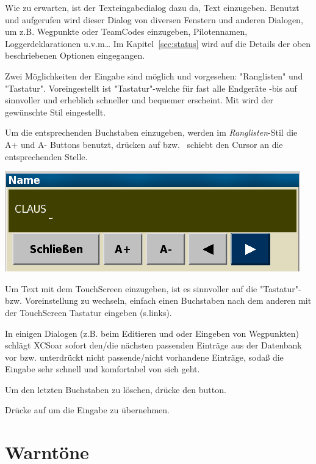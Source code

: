 Wie zu erwarten, ist der Texteingabedialog dazu da, Text einzugeben.
Benutzt und aufgerufen wird dieser Dialog von diversen Fenstern und anderen Dialogen, um z.B. Wegpunkte oder TeamCodes  einzugeben, Pilotennamen, Loggerdeklarationen u.v.m\dots
Im Kapitel~\ref{sec:status} wird auf die Details der oben beschriebenen Optionen eingegangen.

 Zwei Möglichkeiten der Eingabe sind möglich und vorgesehen:  "Ranglisten"  und "Tastatur".
Voreingestellt ist "Tastatur"-welche für fast alle Endgeräte -bis auf \al sinnvoller und erheblich schneller und bequemer erscheint. Mit  wird der gewünschte Stil eingestellt.

Um die entsprechenden  Buchstaben einzugeben, werden im \textit{Ranglisten}-Stil die A+ und  A- Buttons benutzt, drücken auf  \button{$<$} bzw.\   \button{$>$} schiebt den Cursor an die entsprechenden Stelle.
 
\begin{center}
\includegraphics[angle=0,width=0.65\linewidth,keepaspectratio='true']{figures/textentry.png}
\end{center}

Um Text mit dem TouchScreen einzugeben, ist es sinnvoller  auf die "Tastatur"- bzw. Voreinstellung zu wechseln, einfach einen Buchstaben nach dem anderen mit der TouchScreen Tastatur eingeben (s.links).

In einigen Dialogen (z.B. beim Editieren und oder Eingeben von Wegpunkten) schlägt \textsf{XCSoar} sofort den/die nächsten passenden Einträge aus der Datenbank vor bzw. unterdrückt nicht passende/nicht vorhandene Einträge, sodaß die Eingabe sehr schnell und komfortabel von sich geht.

Um den letzten Buchstaben zu löschen, drücke den  \button{$<-$} button.

Drücke auf   um die Eingabe zu übernehmen.

\section{Warntöne}

